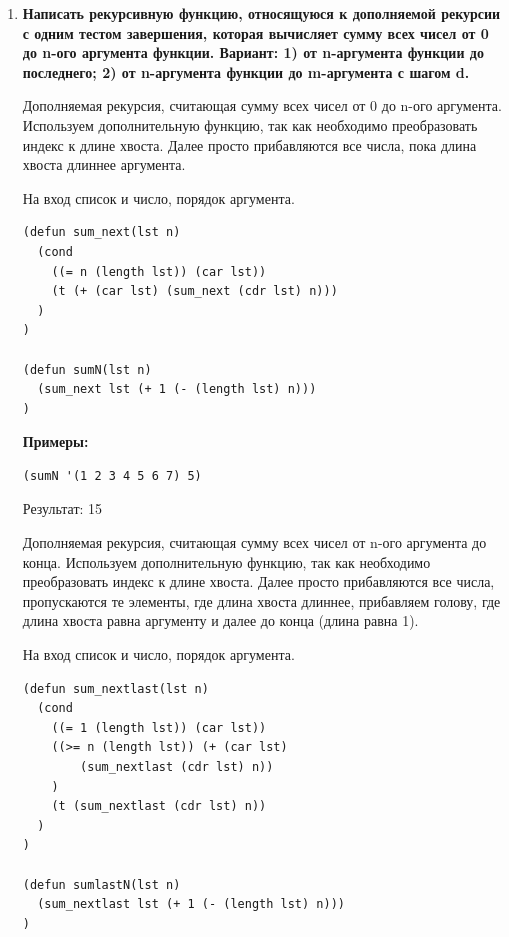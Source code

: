 \documentclass[a4paper,14pt]{extreport} %
\begin{document}
\begin{enumerate}
\begin{lstlisting}
(last_elem '((1) (2 4 5) (3 4 5 (6 7)) (4 (-3) 8)))
\end{lstlisting}

Результат: (4 (-3) 8)

\item \textbf{Написать рекурсивную функцию, относящуюся к дополняемой рекурсии с одним тестом завершения, которая вычисляет сумму всех чисел от 0 до n-ого аргумента функции. Вариант: 1) от n-аргумента функции до последнего; 2) от n-аргумента функции до m-аргумента с шагом d. }

Дополняемая рекурсия, считающая сумму всех чисел от 0 до n-ого аргумента. Используем дополнительную функцию, так как необходимо преобразовать индекс к длине хвоста. Далее просто прибавляются все числа, пока длина хвоста длиннее аргумента. 

На вход список и число, порядок аргумента. 

\begin{lstlisting}
(defun sum_next(lst n)
  (cond
    ((= n (length lst)) (car lst))
    (t (+ (car lst) (sum_next (cdr lst) n)))
  )
)

(defun sumN(lst n)
  (sum_next lst (+ 1 (- (length lst) n)))
)
\end{lstlisting}

\textbf{Примеры:}

\begin{lstlisting}
(sumN '(1 2 3 4 5 6 7) 5)
\end{lstlisting}

Результат: 15

Дополняемая рекурсия, считающая сумму всех чисел от n-ого аргумента до конца. Используем дополнительную функцию, так как необходимо преобразовать индекс к длине хвоста. Далее просто прибавляются все числа, пропускаются те элементы, где длина хвоста длиннее, прибавляем голову, где длина хвоста равна аргументу и далее до конца (длина равна 1). 

На вход список и число, порядок аргумента. 

\begin{lstlisting}
(defun sum_nextlast(lst n)
  (cond
    ((= 1 (length lst)) (car lst))
    ((>= n (length lst)) (+ (car lst) 
    	(sum_nextlast (cdr lst) n))
    )
    (t (sum_nextlast (cdr lst) n))
  )
)

(defun sumlastN(lst n)
  (sum_nextlast lst (+ 1 (- (length lst) n)))
)
\end{lstlisting}


\end{enumerate}
\end{document}
